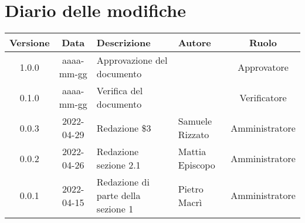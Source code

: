 \section*{Diario delle modifiche}
	\begin{center}
	\renewcommand{\arraystretch}{1.8} %
	\begin{tabular}{ |c|c|m{12em}|m{7em}|c| }
		\hline
		\textbf{Versione} & \textbf{Data} & \textbf{Descrizione} &  \textbf{Autore} &  \textbf{Ruolo} \\
		\hline
		1.0.0 & aaaa-mm-gg & Approvazione del documento & \docApprovazione & Approvatore\\
		\hline
		0.1.0 & aaaa-mm-gg & Verifica del documento & \docVerificatori & Verificatore\\
		\hline
		0.0.3 & 2022-04-29 & Redazione \$3 & Samuele \newline Rizzato & Amministratore\\
		\hline
		0.0.2 & 2022-04-26 & Redazione sezione 2.1 & Mattia \newline Episcopo & Amministratore\\
		\hline
		0.0.1 & 2022-04-15 & Redazione di parte della sezione 1 & Pietro Macrì & Amministratore\\
		\hline
	\end{tabular}
	\end{center}
	\newpage